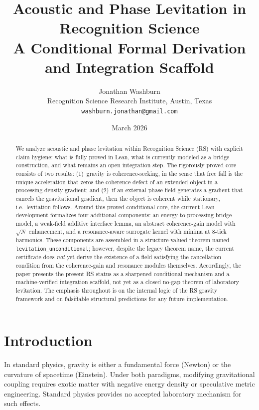 \documentclass[11pt,a4paper]{article}
\title{
    Acoustic and Phase Levitation in Recognition Science\\[0.5em]
    \large A Conditional Formal Derivation and Integration Scaffold
}
\author{
    Jonathan Washburn\\
    Recognition Science Research Institute, Austin, Texas\\
    \texttt{washburn.jonathan@gmail.com}
}
\date{March 2026}
\newcommand{\lean}[1]{\texttt{\small #1}}
\begin{document}
\maketitle

\begin{abstract}
We analyze acoustic and phase levitation within Recognition Science (RS) with explicit claim hygiene: what is fully proved in Lean, what is currently modeled as a bridge construction, and what remains an open integration step.
The rigorously proved core consists of two results:
(1)~gravity is coherence-seeking, in the sense that free fall is the unique acceleration that zeros the coherence defect of an extended object in a processing-density gradient; and
(2)~if an external phase field generates a gradient that cancels the gravitational gradient, then the object is coherent while stationary, i.e.\ levitation follows.
Around this proved conditional core, the current Lean development formalizes four additional components: an energy-to-processing bridge model, a weak-field additive interface lemma, an abstract coherence-gain model with $\sqrt{N}$ enhancement, and a resonance-aware surrogate kernel with minima at 8-tick harmonics.
These components are assembled in a structure-valued theorem named \lean{levitation\_unconditional}; however, despite the legacy theorem name, the current certificate does \emph{not} yet derive the existence of a field satisfying the cancellation condition from the coherence-gain and resonance modules themselves.
Accordingly, the paper presents the present RS status as a sharpened conditional mechanism and a machine-verified integration scaffold, not yet as a closed no-gap theorem of laboratory levitation.
The emphasis throughout is on the internal logic of the RS gravity framework and on falsifiable structural predictions for any future implementation.
\end{abstract}

\tableofcontents
\newpage

\section{Introduction}

In standard physics, gravity is either a fundamental force (Newton) or the curvature of spacetime (Einstein).
Under both paradigms, modifying gravitational coupling requires exotic matter with negative energy density or speculative metric engineering.
Standard physics provides no accepted laboratory mechanism for such effects.
\end{document}
